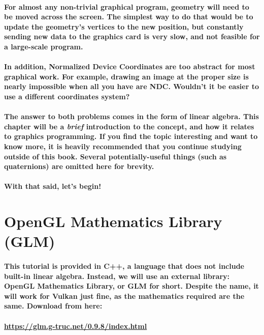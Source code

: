 \paragraph{
    For almost any non-trivial graphical program, geometry will need to be moved across the screen. The simplest way to do that would be to update the geometry's vertices to the new position, but constantly sending new data to the graphics card is very slow, and not feasible for a large-scale program.
}

\paragraph{
    In addition, Normalized Device Coordinates are too abstract for most graphical work. For example, drawing an image at the proper size is nearly impossible when all you have are NDC. Wouldn't it be easier to use a different coordinates system?
}

\paragraph{
    The answer to both problems comes in the form of linear algebra. This chapter will be a \emph{brief} introduction to the concept, and how it relates to graphics programming. If you find the topic interesting and want to know more, it is heavily recommended that you continue studying outside of this book. Several potentially-useful things (such as quaternions) are omitted here for brevity.
}

\paragraph{
    With that said, let's begin!
}

\section{\textsf{OpenGL Mathematics Library (GLM)}}
\paragraph{
    This tutorial is provided in C++, a language that does not include built-in linear algebra. Instead, we will use an external library: OpenGL Mathematics Library, or GLM for short. Despite the name, it will work for Vulkan just fine, as the mathematics required are the same. Download from here:
}

\paragraph{
    \href{https://glm.g-truc.net/0.9.8/index.html}{https://glm.g-truc.net/0.9.8/index.html}
}

